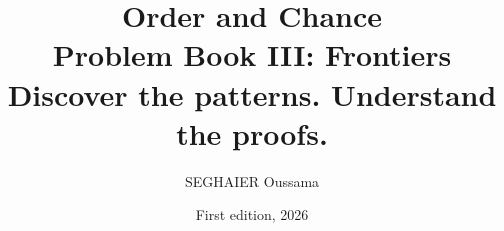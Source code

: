 \documentclass[11pt,openany]{book}
\title{\Huge\textbf{Order and Chance}\\[0.4em]\LARGE Problem Book III: Frontiers\\[0.6em]
\Large Discover the patterns. Understand the proofs.}
\author{SEGHAIER Oussama}
\date{First edition, 2026}
\begin{document}
\frontmatter
\makecover
\maketitle

\tableofcontents

\mainmatter


\end{document}
